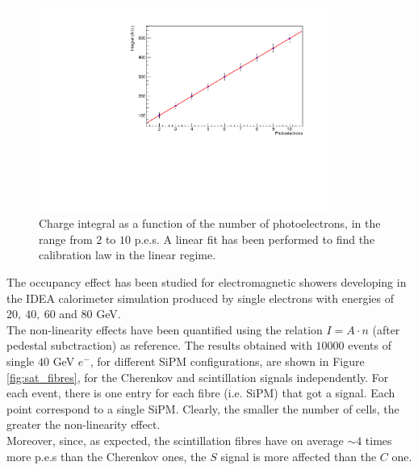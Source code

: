 \begin{figure}
	\centering
	\includegraphics[width=0.85\textwidth]{IMG/Cap5/NoSatLine}
	\caption{Charge integral as a function of the number of photoelectrons, in the range from $2$ to $10$ p.e.s. A linear fit has been performed to find the calibration law in the linear regime.}
	\label{fig:NoSatLine}
\end{figure}

The occupancy effect has been studied for electromagnetic showers developing in the IDEA calorimeter simulation produced by single electrons with energies of $20,\ 40,\ 60$ and $80$ GeV.\\
The non-linearity effects have been quantified using the relation $I = A\cdot n$ (after pedestal subctraction) as reference. The results obtained with $10000$ events of single $40$ GeV $e^-$, for different SiPM configurations, are shown in Figure \ref{fig:sat_fibres}, for the Cherenkov and scintillation signals independently. For each event, there is one entry for each fibre (i.e. SiPM) that got a signal. Each point correspond to a single SiPM. Clearly, the smaller the number of cells, the greater the non-linearity effect.\\
Moreover, since, as expected, the scintillation fibres have on average $\sim 4$ times more p.e.s than the Cherenkov ones, the $S$ signal is more affected than the $C$ one.\\

